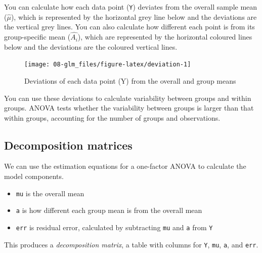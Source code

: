 \documentclass[
  oneside]{book}
\providecommand{\tightlist}{%
  \setlength{\itemsep}{0pt}\setlength{\parskip}{0pt}}
\begin{document}
You can calculate how each data point (\texttt{Y}) deviates from the overall sample mean (\(\hat{\mu}\)), which is represented by the horizontal grey line below and the deviations are the vertical grey lines. You can also calculate how different each point is from its group-specific mean (\(\hat{A_i}\)), which are represented by the horizontal coloured lines below and the deviations are the coloured vertical lines.

\begin{figure}

{\centering \texttt{[image: 08-glm\_files/figure-latex/deviation-1]} 

}

\caption{Deviations of each data point (Y) from the overall and group means}\label{fig:deviation}
\end{figure}

You can use these deviations to calculate variability between groups and within groups. ANOVA tests whether the variability between groups is larger than that within groups, accounting for the number of groups and observations.

\hypertarget{decomp}{%
\subsection{Decomposition matrices}\label{decomp}}

We can use the estimation equations for a one-factor ANOVA to calculate the model components.

\begin{itemize}
\tightlist
\item
  \texttt{mu} is the overall mean
\item
  \texttt{a} is how different each group mean is from the overall mean
\item
  \texttt{err} is residual error, calculated by subtracting \texttt{mu} and \texttt{a} from \texttt{Y}
\end{itemize}

This produces a \emph{decomposition matrix}, a table with columns for \texttt{Y}, \texttt{mu}, \texttt{a}, and \texttt{err}.
\end{document}
